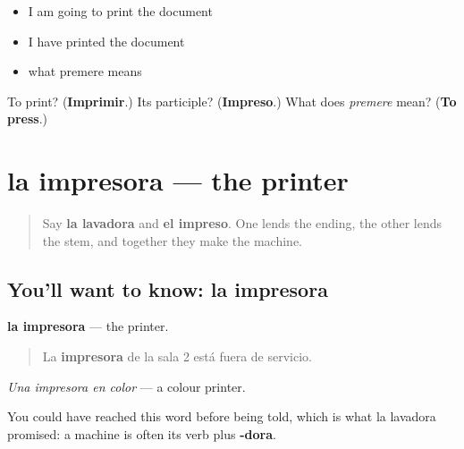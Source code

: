 \begin{itemize}
\raggedright
  \item I am going to print the document
  \item I have printed the document
  \item what premere means
\end{itemize}

\begin{tcolorbox}[breakable,colback=teal!4,colframe=teal!35!black,title={Before you move on}]
To print? (\textbf{Imprimir}.) Its participle? (\textbf{Impreso}.) What does \emph{premere} mean? (\textbf{To press}.)
\end{tcolorbox}
\section[la impresora]{la impresora — the printer}

\label{lesson:ES-C469-impresora}



\begin{quote}
Say \textbf{la lavadora} and \textbf{el impreso}. One lends the ending, the other lends the stem, and together they make the machine.
\end{quote}

\subsection*{You'll want to know: la impresora}
\textbf{la impresora} — the printer.

\begin{quote}
La \textbf{impresora} de la sala 2 está fuera de servicio.
\end{quote}

\emph{Una impresora en color} — a colour printer.

You could have reached this word before being told, which is what la lavadora promised: a machine is often its verb plus \textbf{-dora}.

